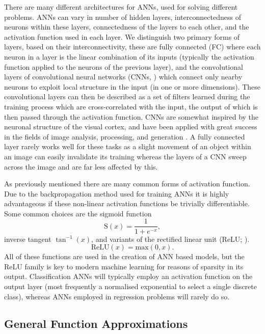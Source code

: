 There are many different architectures for ANNs, used for solving different problems.
ANNs can vary in number of hidden layers, interconnectedness of neurons within these layers, connectedness of the layers to each other, and the activation function used in each layer.
We distinguish two primary forms of layers, based on their interconnectivity, these are fully connected (FC) where each neuron in a layer is the linear combination of its inputs (typically the activation function applied to the neurons of the previous layer), and the convolutional layers of convolutional neural networks (CNNs, \citet{1998Lecun,2003Simard}) which connect only nearby neurons to exploit local structure in the input (in one or more dimensions).
These convolutional layers can then be described as a set of filters learned during the training process which are cross-correlated with the input, the output of which is then passed through the activation function.
CNNs are somewhat inspired by the neuronal structure of the visual cortex, and have been applied with great success in the fields of image analysis, processing, and generation \citep{Raschka2015}.
A fully connected layer rarely works well for these tasks as a slight movement of an object within an image can easily invalidate its training whereas the layers of a CNN sweep across the image and are far less affected by this.

As previously mentioned there are many common forms of activation function.
Due to the backpropagation method used for training ANNs it is highly advantageous if these non-linear activation functions be trivially differentiable.
Some common choices are the sigmoid function
\begin{equation}
    \mathrm{S}(x) = \frac{1}{1+e^{-x}},
\end{equation}
inverse tangent $\tan^{-1}(x)$, and variants of the rectified linear unit (ReLU; \citet{2010Nair}).
\begin{equation}
    \mathrm{ReLU}(x) = \mathrm{max}(0, x).
\end{equation}
All of these functions are used in the creation of ANN based models, but the ReLU family is key to modern machine learning for reasons of sparsity in its output.
Classification ANNs will typically employ an activation function on the output layer (most frequently a normalised exponential to select a single discrete class), whereas ANNs employed in regression problems will rarely do so.

\subsection{General Function Approximations}


